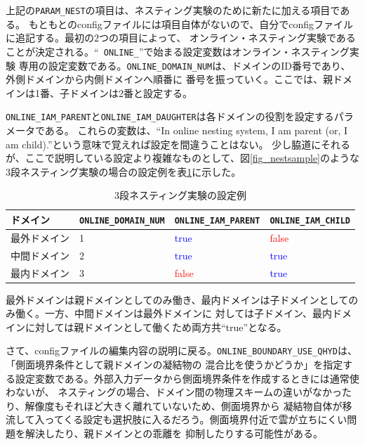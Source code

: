 \noindent 上記の\verb|PARAM_NEST|の項目は、ネスティング実験のために新たに加える項目である。
もともとのconfigファイルには項目自体がないので、自分でconfigファイルに追記する。最初の2つの項目によって、
オンライン・ネスティング実験であることが決定される。``\verb| ONLINE_|''で始まる設定変数はオンライン・ネスティング実験
専用の設定変数である。\verb|ONLINE_DOMAIN_NUM|は、ドメインのID番号であり、外側ドメインから内側ドメインへ順番に
番号を振っていく。ここでは、親ドメインは1番、子ドメインは2番と設定する。

\verb|ONLINE_IAM_PARENT|と\verb|ONLINE_IAM_DAUGHTER|は各ドメインの役割を設定するパラメータである。
これらの変数は、``In online nesting system, I am parent (or, I am child).''という意味で覚えれば設定を間違うことはない。
少し脇道にそれるが、ここで説明している設定より複雑なものとして、図\ref{fig_nestsample}のような
3段ネスティング実験の場合の設定例を表\ref{tab:triple_nested}に示した。

\begin{table}[htb]
\begin{center}
\caption{3段ネスティング実験の設定例}
\begin{tabularx}{150mm}{|l|l|l|X|} \hline
 \rowcolor[gray]{0.9} ドメイン & \verb|ONLINE_DOMAIN_NUM| & \verb|ONLINE_IAM_PARENT| & \verb|ONLINE_IAM_CHILD|\\ \hline
 最外ドメイン & 1 & \textcolor{blue}{true} & \textcolor{red}{false} \\ \hline
 中間ドメイン & 2 & \textcolor{blue}{true} & \textcolor{blue}{true} \\ \hline
 最内ドメイン & 3 & \textcolor{red}{false} & \textcolor{blue}{true} \\ \hline
\end{tabularx}
\label{tab:triple_nested}
\end{center}
\end{table}

\noindent 最外ドメインは親ドメインとしてのみ働き、最内ドメインは子ドメインとしてのみ働く。一方、中間ドメインは最外ドメインに
対しては子ドメイン、最内ドメインに対しては親ドメインとして働くため両方共``true''となる。

さて、configファイルの編集内容の説明に戻る。\verb|ONLINE_BOUNDARY_USE_QHYD|は、「側面境界条件として親ドメインの凝結物の
混合比を使うかどうか」を指定する設定変数である。外部入力データから側面境界条件を作成するときには通常使わないが、
ネスティングの場合、ドメイン間の物理スキームの違いがなかったり、解像度もそれほど大きく離れていないため、側面境界から
凝結物自体が移流して入ってくる設定も選択肢に入るだろう。側面境界付近で雲が立ちにくい問題を解決したり、親ドメインとの乖離を
抑制したりする可能性がある。

